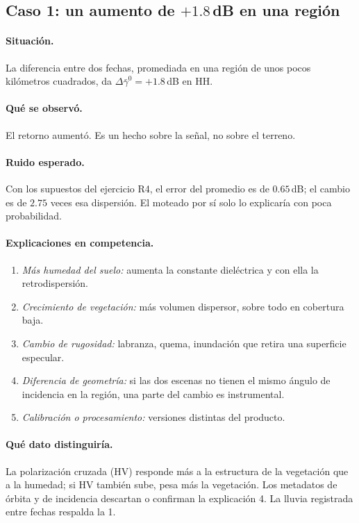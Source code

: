 \documentclass[11pt,a4paper]{article}
\begin{document}
\subsection{Caso 1: un aumento de $+1.8$\,dB en una región}

\paragraph{Situación.} La diferencia entre dos fechas, promediada en una región de unos pocos kilómetros
cuadrados, da $\Delta\bar\gamma^0=+1.8$\,dB en HH.

\paragraph{Qué se observó.} El retorno aumentó. Es un hecho sobre la señal, no sobre el terreno.

\paragraph{Ruido esperado.} Con los supuestos del ejercicio R4, el error del promedio es de $0.65$\,dB; el
cambio es de $2.75$ veces esa dispersión. El moteado por sí solo lo explicaría con poca probabilidad.

\paragraph{Explicaciones en competencia.}
\begin{enumerate}
  \item \emph{Más humedad del suelo:} aumenta la constante dieléctrica y con ella la retrodispersión.
  \item \emph{Crecimiento de vegetación:} más volumen dispersor, sobre todo en cobertura baja.
  \item \emph{Cambio de rugosidad:} labranza, quema, inundación que retira una superficie especular.
  \item \emph{Diferencia de geometría:} si las dos escenas no tienen el mismo ángulo de incidencia en la
        región, una parte del cambio es instrumental.
  \item \emph{Calibración o procesamiento:} versiones distintas del producto.
\end{enumerate}

\paragraph{Qué dato distinguiría.} La polarización cruzada (HV) responde más a la estructura de la
vegetación que a la humedad; si HV también sube, pesa más la vegetación. Los metadatos de órbita y de
incidencia descartan o confirman la explicación 4. La lluvia registrada entre fechas respalda la 1.
\end{document}
